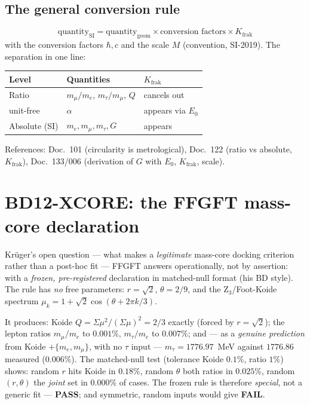 \subsection{The general conversion rule}
\[
\boxed{\ \text{quantity}_{\text{SI}}=\text{quantity}_{\text{geom}}\times\text{conversion factors}\times K_{\text{frak}}\ }
\]
with the conversion factors $\hbar,c$ and the scale $M$ (convention, SI-2019). The separation in one
line:
\begin{center}
\begin{tabular}{@{}p{3cm} p{6.2cm} p{2.8cm}@{}}
\toprule
Level & Quantities & $K_{\text{frak}}$ \\
\midrule
Ratio & $m_\mu/m_e$, $m_\tau/m_\mu$, $Q$ & cancels out \\
unit-free & $\alpha$ & appears via $E_0$ \\
Absolute (SI) & $m_e,m_\mu,m_\tau,G$ & appears \\
\bottomrule
\end{tabular}
\end{center}
References: Doc.~101 (circularity is metrological), Doc.~122 (ratio vs absolute, $K_{\text{frak}}$),
Doc.~133/006 (derivation of $G$ with $E_0$, $K_{\text{frak}}$, scale).

\section{BD12-XCORE: the FFGFT mass-core declaration}
Kr\"uger's open question --- what makes a \emph{legitimate} mass-core docking criterion rather than a
post-hoc fit --- FFGFT answers operationally, not by assertion: with a \emph{frozen, pre-registered}
declaration in matched-null format (his BD style). The rule has \emph{no} free parameters: $r=\sqrt2$,
$\theta=2/9$, and the Z$_3$/Foot-Koide spectrum $\mu_k = 1+\sqrt2\cos(\theta+2\pi k/3)$.

It produces: Koide $Q=\Sigma\mu^2/(\Sigma\mu)^2 = 2/3$ exactly (forced by $r=\sqrt2$); the lepton
ratios $m_\mu/m_e$ to $0.001\%$, $m_\tau/m_e$ to $0.007\%$; and --- as a \emph{genuine prediction}
from Koide $+\{m_e,m_\mu\}$, with no $\tau$ input --- $m_\tau=1776.97$~MeV against $1776.86$ measured
($0.006\%$). The matched-null test (tolerance Koide $0.1\%$, ratio $1\%$) shows: random $r$ hits Koide
in $0.18\%$, random $\theta$ both ratios in $0.025\%$, random $(r,\theta)$ the \emph{joint} set in
$0.000\%$ of cases. The frozen rule is therefore \emph{special}, not a generic fit ---
\textbf{PASS}; and symmetric, random inputs would give \textbf{FAIL}.

